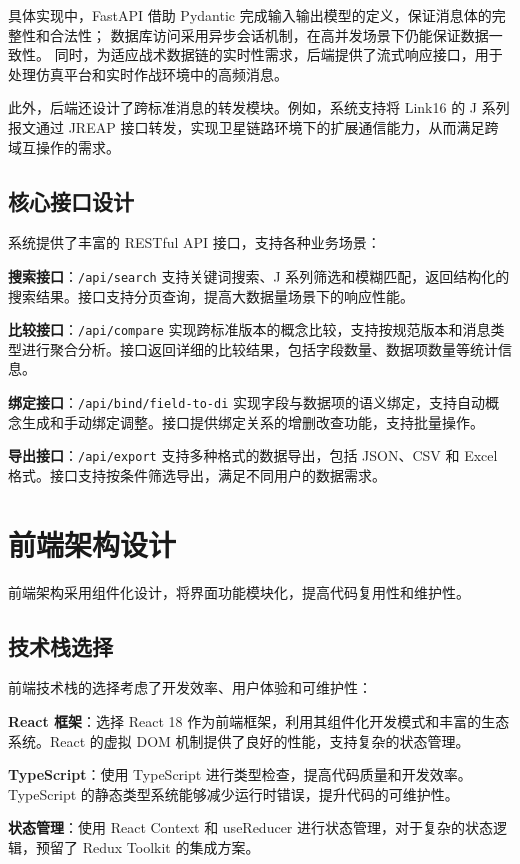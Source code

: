 具体实现中，FastAPI 借助 Pydantic 完成输入输出模型的定义，保证消息体的完整性和合法性；  
数据库访问采用异步会话机制，在高并发场景下仍能保证数据一致性。  
同时，为适应战术数据链的实时性需求，后端提供了流式响应接口，用于处理仿真平台和实时作战环境中的高频消息。  

此外，后端还设计了跨标准消息的转发模块。例如，系统支持将 {Link16} 的 J 系列报文通过 {JREAP} 接口转发，实现卫星链路环境下的扩展通信能力，从而满足跨域互操作的需求。  

\subsection{核心接口设计}
系统提供了丰富的 RESTful API 接口，支持各种业务场景：

\textbf{搜索接口}：\texttt{/api/search} 支持关键词搜索、J 系列筛选和模糊匹配，返回结构化的搜索结果。接口支持分页查询，提高大数据量场景下的响应性能。

\textbf{比较接口}：\texttt{/api/compare} 实现跨标准版本的概念比较，支持按规范版本和消息类型进行聚合分析。接口返回详细的比较结果，包括字段数量、数据项数量等统计信息。

\textbf{绑定接口}：\texttt{/api/bind/field-to-di} 实现字段与数据项的语义绑定，支持自动概念生成和手动绑定调整。接口提供绑定关系的增删改查功能，支持批量操作。

\textbf{导出接口}：\texttt{/api/export} 支持多种格式的数据导出，包括 JSON、CSV 和 Excel 格式。接口支持按条件筛选导出，满足不同用户的数据需求。

\section{前端架构设计}

前端架构采用组件化设计，将界面功能模块化，提高代码复用性和维护性。

\subsection{技术栈选择}
前端技术栈的选择考虑了开发效率、用户体验和可维护性：

\textbf{React 框架}：选择 React 18 作为前端框架，利用其组件化开发模式和丰富的生态系统。React 的虚拟 DOM 机制提供了良好的性能，支持复杂的状态管理。

\textbf{TypeScript}：使用 TypeScript 进行类型检查，提高代码质量和开发效率。TypeScript 的静态类型系统能够减少运行时错误，提升代码的可维护性。

\textbf{状态管理}：使用 React Context 和 useReducer 进行状态管理，对于复杂的状态逻辑，预留了 Redux Toolkit 的集成方案。

